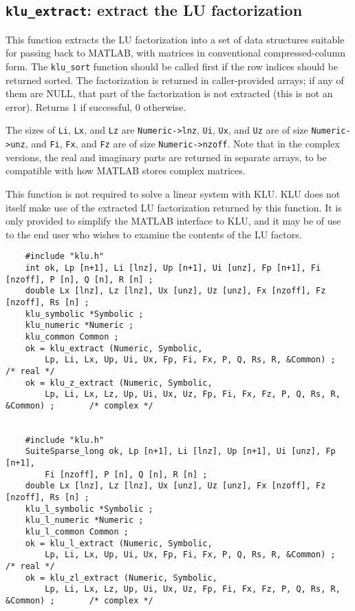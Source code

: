 \documentclass[11pt]{article}
\begin{document}
\subsection{{\tt klu\_extract}: extract the LU factorization}

This function extracts the LU factorization into a set of data structures
suitable for passing back to MATLAB, with matrices in conventional
compressed-column form.  The {\tt klu\_sort} function should be called first if
the row indices should be returned sorted.  The factorization is returned in
caller-provided arrays; if any of them are NULL, that part of the factorization
is not extracted (this is not an error).  Returns 1 if successful, 0 otherwise.

The sizes of {\tt Li}, {\tt Lx}, and {\tt Lz} are {\tt Numeric->lnz},
{\tt Ui}, {\tt Ux}, and {\tt Uz} are of size {\tt Numeric->unz}, and
{\tt Fi}, {\tt Fx}, and {\tt Fz} are of size {\tt Numeric->nzoff}.
Note that in the complex versions, the real and imaginary parts are returned
in separate arrays, to be compatible with how MATLAB stores complex matrices.

This function is not required to solve a linear system with KLU.  KLU does not
itself make use of the extracted LU factorization returned by this function.
It is only provided to simplify the MATLAB interface to KLU, and it may be of
use to the end user who wishes to examine the contents of the LU factors.

{\footnotesize
\begin{verbatim}
    #include "klu.h"
    int ok, Lp [n+1], Li [lnz], Up [n+1], Ui [unz], Fp [n+1], Fi [nzoff], P [n], Q [n], R [n] ;
    double Lx [lnz], Lz [lnz], Ux [unz], Uz [unz], Fx [nzoff], Fz [nzoff], Rs [n] ;
    klu_symbolic *Symbolic ;
    klu_numeric *Numeric ;
    klu_common Common ;
    ok = klu_extract (Numeric, Symbolic,
        Lp, Li, Lx, Up, Ui, Ux, Fp, Fi, Fx, P, Q, Rs, R, &Common) ;                   /* real */
    ok = klu_z_extract (Numeric, Symbolic,
        Lp, Li, Lx, Lz, Up, Ui, Ux, Uz, Fp, Fi, Fx, Fz, P, Q, Rs, R, &Common) ;       /* complex */


    #include "klu.h"
    SuiteSparse_long ok, Lp [n+1], Li [lnz], Up [n+1], Ui [unz], Fp [n+1],
        Fi [nzoff], P [n], Q [n], R [n] ;
    double Lx [lnz], Lz [lnz], Ux [unz], Uz [unz], Fx [nzoff], Fz [nzoff], Rs [n] ;
    klu_l_symbolic *Symbolic ;
    klu_l_numeric *Numeric ;
    klu_l_common Common ;
    ok = klu_l_extract (Numeric, Symbolic,
        Lp, Li, Lx, Up, Ui, Ux, Fp, Fi, Fx, P, Q, Rs, R, &Common) ;                   /* real */
    ok = klu_zl_extract (Numeric, Symbolic,
        Lp, Li, Lx, Lz, Up, Ui, Ux, Uz, Fp, Fi, Fx, Fz, P, Q, Rs, R, &Common) ;       /* complex */
\end{verbatim}
}
\end{document}
